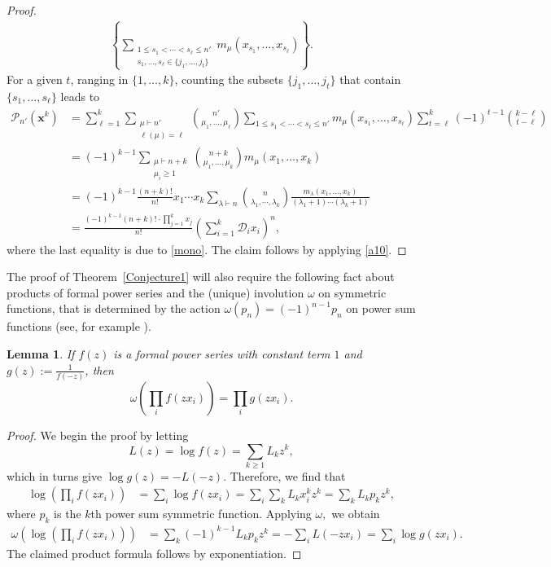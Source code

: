 \documentclass[11pt]{amsart}
\newtheorem{lemma}[theorem]{Lemma}
\theoremstyle{definition}
\theoremstyle{remark}
\numberwithin{equation}{section}
\begin{document}
\begin{proof}
\begin{align*}
\left\{ \sum_{\substack{1\leq s_1<\cdots<s_{\ell}\leq n' \\ s_1,\dots,s_{\ell}\in\{j_1,\dots,j_t\}}} m_{\mu}(x_{s_1},\dots,x_{s_{\ell}})  \right\}.  
\end{align*}
For a given $t$, ranging in $\{1,\dots,k\}$, counting the subsets $\{j_1,\dots,j_t\}$ that contain $\{s_1,\dots,s_{\ell}\}$ leads to
\begin{align*}
\mathcal{P}_{n'}(\pmb{x}^k)
&= \sum_{\ell=1}^k
\sum_{\substack{\mu\vdash n' \\ \ell(\mu)=\ell}} \binom{n'}{\mu_1,\dots,\mu_{\ell}} 
\sum_{1\leq s_1<\cdots<s_{\ell}\leq n'} m_{\mu}(x_{s_1},\dots,x_{s_{\ell}})   
\sum_{t=\ell}^k (-1)^{t-1}\binom{k-\ell}{t-\ell} \\
& = (-1)^{k-1} \sum_{\substack{\mu\vdash n+k \\ \mu_i\geq1 }} \binom{n+k}{\mu_1,\dots,\mu_k}   
m_{\mu}(x_1,\dots,x_k)   \\
& = (-1)^{k-1} \frac{(n+k)!}{n!}x_1\cdots x_k \sum_{\lambda\vdash n} \binom{n}{\lambda_1,\cdots,\lambda_k} 
\frac{m_{\lambda} (x_1,\dots,x_k)}{(\lambda_1+1)\cdots(\lambda_k+1)} \\
& = \frac{(-1)^{k-1}(n+k)! \cdot \prod_{j=1}^kx_j}{n!} \left(\sum_{i=1}^k\mathcal{D}_i x_i\right)^n,
\end{align*}
where the last equality is due to \eqref{mono}. The claim follows by applying \eqref{a10}.
\end{proof}

The proof of Theorem~\ref{Conjecture1} will also require the following fact about products of formal power series and the (unique) involution $\omega$ on symmetric functions, that is determined by the action $\omega(p_n)=(-1)^{n-1}p_n$ on power sum functions 
(see, for example \cite[Chapter 7]{RPS}). 

\begin{lemma} \label{invol} If $f(z)$ is a formal power series with constant term $1$ and $g(z):=\frac1{f(-z)}$, then 
$$\omega\left(\prod_if(zx_i)\right)=\prod_i g(zx_i).$$
\end{lemma}

\begin{proof} We begin the proof by letting
$$L(z)=\log f(z)=\sum_{k\geq1} L_kz^k,
$$
which in turns give $\log g(z)=-L(-z).$
Therefore, we find that
\begin{align*} \log\left(\prod_i f(zx_i)\right) & =\sum_i\log f(zx_i) = \sum_i \sum_k L_k x_i^kz^k=\sum_k L_kp_kz^k,
\end{align*}
where $p_k$ is the $k$th power sum symmetric function. Applying $\omega,$ we obtain
\begin{align*} \omega\left(\log\left(\prod_i f(zx_i)\right)\right) & = \sum_k (-1)^{k-1}L_kp_kz^k = -\sum_i L(-zx_i)=\sum_i \log g(zx_i).
\end{align*}
The claimed product formula follows by exponentiation.
\end{proof}
\end{document}
